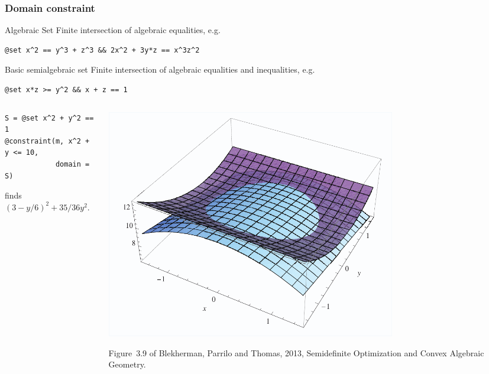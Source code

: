 \documentclass{beamer}
\begin{document}
  \begin{frame}[fragile]
    \frametitle{Domain constraint}
    \begin{block}{Algebraic Set}
      Finite intersection of algebraic equalities, e.g.
\begin{verbatim}
@set x^2 == y^3 + z^3 && 2x^2 + 3y*z == x^3z^2
\end{verbatim}
    \end{block}
    \begin{block}{Basic semialgebraic set}
      Finite intersection of algebraic equalities and inequalities, e.g.
\begin{verbatim}
@set x*z >= y^2 && x + z == 1
\end{verbatim}
    \end{block}
    \begin{columns}
      \begin{column}{0.5\textwidth}
\begin{verbatim}
S = @set x^2 + y^2 == 1
@constraint(m, x^2 + y <= 10,
            domain = S)
\end{verbatim}
    finds $(3-y/6)^2 + 35/36y^2$.
      \end{column}
      \begin{column}{0.5\textwidth}
        \centering
        \includegraphics[width=0.7\textwidth]{algebraic_set.png}

        \tiny
        Figure~3.9 of Blekherman, Parrilo and Thomas, 2013, Semidefinite Optimization and Convex Algebraic Geometry.
      \end{column}
    \end{columns}
  \end{frame}
\end{document}
